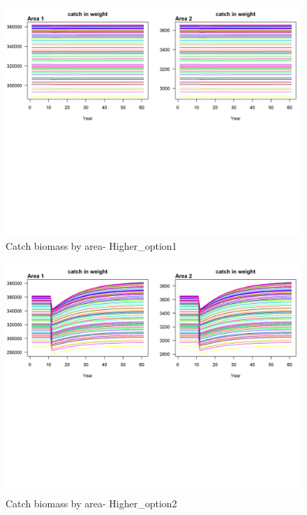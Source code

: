 \documentclass[
]{book}
\begin{document}
\begin{figure}
\includegraphics[width=1\linewidth]{data-test/Kole/Higher_option1_catchB_Area} \caption{Catch biomass by area- Higher_option1 }\label{fig:fig-catch-H-opt1}
\end{figure}

\begin{figure}
\includegraphics[width=1\linewidth]{data-test/Kole/Higher_option2_catchB_Area} \caption{Catch biomass by area- Higher_option2 }\label{fig:fig-catch-H-opt2}
\end{figure}
\end{document}
